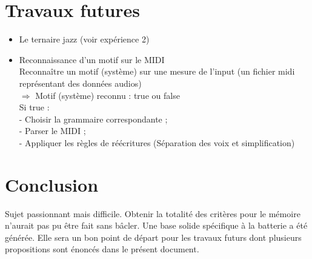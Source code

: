 \section{Travaux futures}
\begin{itemize}
	\item Le ternaire jazz (voir expérience 2)
	\item Reconnaissance d’un motif sur le MIDI\\
	Reconnaître un motif (système) sur une mesure de l’input (un fichier midi représentant des données audios)\\
	$\Rightarrow$ Motif (système) reconnu : true ou false\\
	Si true :\\
	- Choisir la grammaire correspondante ;\\
	- Parser le MIDI ;\\
	- Appliquer les règles de réécritures (Séparation des voix et simplification)
\end{itemize}
\section*{Conclusion}
Sujet passionnant mais difficile. Obtenir la totalité des critères pour le mémoire n’aurait pas pu être fait sans bâcler. Une base solide spécifique à la batterie a été générée. Elle sera un bon point de départ pour les travaux futurs dont plusieurs propositions sont énoncés dans le présent document.